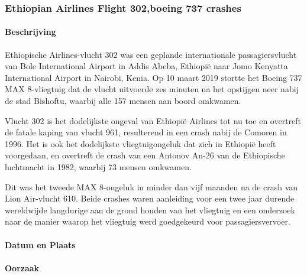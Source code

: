 \documentclass{article}
\begin{document}
	\subsubsection{Ethiopian Airlines Flight 302,boeing 737 crashes}
	
	\paragraph{Beschrijving}
	
	Ethiopische Airlines-vlucht 302 was een geplande internationale passagiersvlucht van Bole International Airport in Addis Abeba, Ethiopië naar Jomo Kenyatta International Airport in Nairobi, Kenia. Op 10 maart 2019 stortte het Boeing 737 MAX 8-vliegtuig dat de vlucht uitvoerde zes minuten na het opstijgen neer nabij de stad Bishoftu, waarbij alle 157 mensen aan boord omkwamen.
	
	Vlucht 302 is het dodelijkste ongeval van Ethiopië Airlines tot nu toe en overtreft de fatale kaping van vlucht 961, resulterend in een crash nabij de Comoren in 1996. Het is ook het dodelijkste vliegtuigongeluk dat zich in Ethiopië heeft voorgedaan, en overtreft de crash van een Antonov An-26 van de Ethiopische luchtmacht in 1982, waarbij 73 mensen omkwamen.
	
	Dit was het tweede MAX 8-ongeluk in minder dan vijf maanden na de crash van Lion Air-vlucht 610. Beide crashes waren aanleiding voor een twee jaar durende wereldwijde langdurige aan de grond houden van het vliegtuig en een onderzoek naar de manier waarop het vliegtuig werd goedgekeurd voor passagiersvervoer.
	\paragraph{Datum en Plaats}
	
	
	\paragraph{Oorzaak}
	
\end{document}
